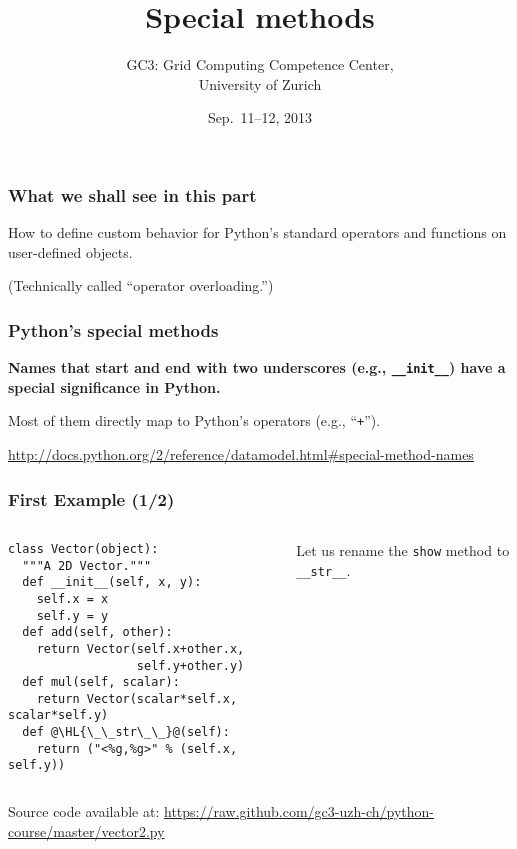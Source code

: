 \documentclass[english,serif,mathserif,xcolor=pdftex,dvipsnames,table]{beamer}
\title[Special methods]{%
  Special methods
}
\author[GC3]{%
  GC3: Grid Computing Competence Center, \\
  University of Zurich
}
\date{Sep.~11--12, 2013}
\begin{document}
\maketitle


\begin{frame}
  \frametitle{What we shall see in this part}

  How to define custom behavior for Python's standard operators and
  functions on user-defined objects.

  \+
  (Technically called ``operator overloading.'')
\end{frame}


\begin{frame}[fragile]
  \frametitle{Python's special methods}

  \textbf{Names that start and end with two underscores (e.g.,
    \lstinline|__init__|) have a special significance in Python.}

  \+ Most of them directly map to Python's operators (e.g.,
  ``\texttt{+}'').

  \+
  \begin{references}
    \url{http://docs.python.org/2/reference/datamodel.html#special-method-names}
  \end{references}
\end{frame}


\begin{frame}[fragile]
  \frametitle{First Example (1/2)}
  \begin{columns}[t]
    \begin{column}{0.5\textwidth}
\begin{lstlisting}
class Vector(object):
  """A 2D Vector."""
  def __init__(self, x, y):
    self.x = x
    self.y = y
  def add(self, other):
    return Vector(self.x+other.x,
                  self.y+other.y)
  def mul(self, scalar):
    return Vector(scalar*self.x, scalar*self.y)
  def @\HL{\_\_str\_\_}@(self):
    return ("<%g,%g>" % (self.x, self.y))
\end{lstlisting}
    \end{column}
    \begin{column}{0.5\textwidth}
      \raggedleft
      Let us rename the \texttt{show} method to \texttt{\_\_str\_\_}.
    \end{column}
  \end{columns}

  \+
  {\scriptsize Source code available at:
    \url{https://raw.github.com/gc3-uzh-ch/python-course/master/vector2.py}}
\end{frame}
\end{document}
